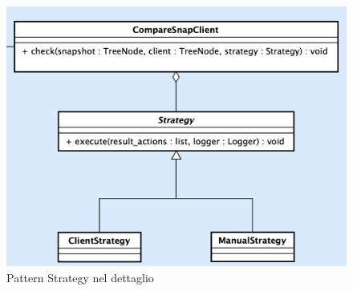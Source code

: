 \begin{figure}[H]
    \centering
    \includegraphics[scale = 0.45]{components/img/strategy-model.png}
    \caption{Pattern Strategy nel dettaglio}
    \label{fig:Pattern proxy nel dettaglio}
\end{figure}
